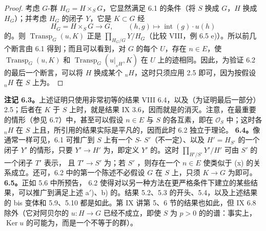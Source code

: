 \begin{proof}
考虑 $G$-群 $H_G=H\times_S G$，它显然满足 6.1 的条件（将 $S$ 换成 $G$，$H$ 换成 $H_G$）；并考虑 $H_G$ 的闭子 $Y$，它是 $K\subset G$ 经
\[H_G=H\times_S G\longrightarrow G,\qquad(h,g)\longmapsto\operatorname{int}(g)\cdot u(h)\]
的。则 $\operatorname{Transp}_G(u,K)$ 正是 $\prod_{H_G/G}Y/H_G$（比较 VIII，例 6.5 e)）。所以前几个断言由 6.1 得到；而且可以看到，对 $G$ 的每个 $U$，存在 $n\in E$，使 $\operatorname{Transp}_G(u,K)$ 和 $\operatorname{Transp}_G(u|_{{}_nH},K)$ 在 $U$ 上的迹相同。因此，为验证 6.2 的最后一个断言，可以将 $H$ 换成某个 ${}_nH$，这时只须应用 2.5 即可，因为按假设 ${}_nH$ 在 $S$ 上为。
\end{proof}
\textbf{注记 6.3。}上述证明只使用非常初等的结果 VIII 6.4，以及（为证明最后一部分）2.5；后者在 $K$ 于 $S$ 上时，就是结果 IX 3.6，因而就是的消灭。注意，在最重要的情形（参见 6.7）中，甚至可以假设 $n\in E$ 与 $S$ 的各互素，即在 $\mathscr O_S$ 中；这时各 ${}_nH$ 在 $S$ 上且，所引用的结果实际是平凡的，因而此时 6.2 独立于理论。
\textbf{6.4。}像通常一样可见，6.1 可推广到 $S$ 上有一个 $S$- $S'$（不一定）、以及 $H'=H_{S'}$ 的一个闭子 $Y'$ 的情形，只要 $Y'\to H'$ 为，即定义 $Y'$ 的。这时 $\prod_{H'/S'}Y'/H'$ 可由 $S'$ 的一个闭子 $T'$ 表示，
且 $T'\to S'$ 为；若 $S'$ ，则存在一个 $n\in E$ 使类似于 (x) 的关系成立。还可，6.2 中的第一个陈述不必假设 $G$ 在 $S$ 上，只须 $K\to G$ 为即可。
\textbf{6.5。}正如 5.6 中所预告， 6.2 使得对以另一种方法在更严格条件下建立的某些结果，可以推广到满足上述 a$'$)、b) 的。结果 5.2、5.3 的开头、5.4，以及上述结果的 bis 变体和 5.9、5.10 都是如此。第 IX 讲第 5、6 节的结果也如此，但 IX 6.8 除外（它对阿贝尔的 $u:H\to G$ 已经不成立，即使 $S$ 为 $p>0$ 的的谱：事实上，$\operatorname{Ker}u$ 的可能为，而是一个不等于的群）。
